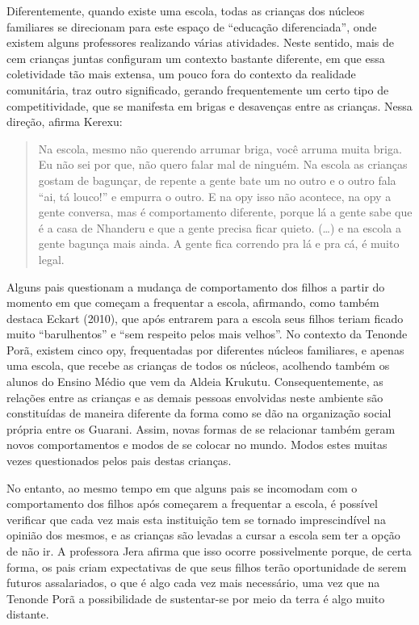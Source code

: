 Diferentemente, quando existe uma escola, todas as crianças dos núcleos
familiares se direcionam para este espaço de ``educação diferenciada'',
onde existem alguns professores realizando várias atividades. Neste
sentido, mais de cem crianças juntas configuram um contexto bastante
diferente, em que essa coletividade tão mais extensa, um pouco fora do
contexto da realidade comunitária, traz outro significado, gerando
frequentemente um certo tipo de competitividade, que se manifesta em
brigas e desavenças entre as crianças. Nessa direção, afirma Kerexu:

\begin{quotation}
Na escola, mesmo não querendo arrumar briga, você arruma muita briga. Eu
não sei por que, não quero falar mal de ninguém. Na escola as crianças
gostam de bagunçar, de repente a gente bate um no outro e o outro fala
``ai, tá louco!'' e empurra o outro. E na opy isso não acontece, na opy a
gente conversa, mas é comportamento diferente, porque lá a gente sabe
que é a casa de Nhanderu e que a gente precisa ficar quieto. (\ldots{}) e na
escola a gente bagunça mais ainda. A gente fica correndo pra lá e pra
cá, é muito legal.
\end{quotation}

Alguns pais questionam a mudança de comportamento dos filhos a partir do
momento em que começam a frequentar a escola, afirmando, como também
destaca Eckart (2010), que após entrarem para a escola seus filhos
teriam ficado muito ``barulhentos'' e ``sem respeito pelos mais velhos''.
No contexto da Tenonde Porã, existem cinco opy, frequentadas por
diferentes núcleos familiares, e apenas uma escola, que recebe as
crianças de todos os núcleos, acolhendo também os alunos do Ensino
Médio que vem da Aldeia Krukutu. Consequentemente, as relações entre as
crianças e as demais pessoas envolvidas neste ambiente são constituídas
de maneira diferente da forma como se dão na organização social própria
entre os Guarani. Assim, novas formas de se relacionar também geram
novos comportamentos e modos de se colocar no mundo. Modos estes muitas
vezes questionados pelos pais destas crianças. 

No entanto, ao mesmo tempo em que alguns pais se incomodam com o
comportamento dos filhos após começarem a frequentar a escola, é
possível verificar que cada vez mais esta instituição tem se tornado
imprescindível na opinião dos mesmos, e as crianças são levadas a
cursar a escola sem ter a opção de não ir. A professora Jera afirma que
isso ocorre possivelmente porque, de certa forma, os pais criam
expectativas de que seus filhos terão oportunidade de serem futuros
assalariados, o que é algo cada vez mais necessário, uma vez que na
Tenonde Porã a possibilidade de sustentar-se por meio da terra é algo
muito distante.

